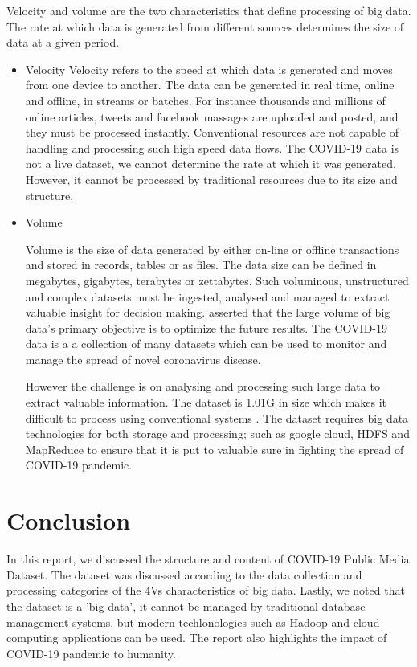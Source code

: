 \documentclass[12pt,letterpaper, twoside]{article}
\begin{document}
Velocity and volume are the two characteristics that define processing of big data.  The rate at which data is generated from different sources determines the size of data at a given period. 
\begin{itemize}

    \item Velocity
    	Velocity refers to the speed at which data is generated and moves from one device to another. The data can be generated in real time, online and offline, in streams or batches. For instance thousands and millions of online articles, tweets and facebook massages are uploaded and posted, and they must be processed instantly. Conventional resources are not capable of handling and processing such high speed data flows. The COVID-19 data is not a live dataset, we cannot determine the rate at which it was generated. However, it cannot be processed by traditional resources due to its size and structure.
    	
    	\item Volume
    	
    	Volume is the size of data generated by either on-line or offline transactions and stored in records, tables or as files. The data size can be defined in megabytes, gigabytes, terabytes or zettabytes.   Such voluminous, unstructured and complex datasets must be ingested, analysed and managed to extract valuable insight for decision making. \cite{Owais} asserted that the large volume of big data’s primary objective is to optimize the future results. The COVID-19 data is a a collection of many datasets which can be used to monitor and manage the spread of novel coronavirus disease.
    	
    	However the challenge is on analysing and processing such large data to extract valuable information. The dataset is 1.01G in size which makes it difficult to process using conventional systems \cite{Patel et al}. The dataset requires big data technologies for both storage and processing; such as google cloud, HDFS and MapReduce to ensure that it is put to valuable sure in fighting the spread of COVID-19 pandemic.
    	
\end{itemize}

\section{Conclusion}
In this report, we discussed the structure and content of COVID-19 Public Media Dataset. The  dataset  was discussed according to the data  collection and processing categories of the 4Vs characteristics of big data. Lastly, we noted that the dataset is a 'big data', it cannot  be managed by traditional database management systems, but modern techlonologies such as Hadoop and cloud computing applications can be used. The report also highlights the impact of COVID-19 pandemic to humanity. 
\end{document}
